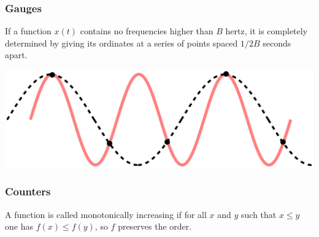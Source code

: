 \begin{frame}
    \frametitle{Gauges}

    \begin{theorem}
        If a function $x(t)$ contains no frequencies higher than $B$ hertz, it
        is completely determined by giving its ordinates at a series of points
        spaced $1 / 2B$ seconds apart.
    \end{theorem}

    \begin{center}
        \includegraphics[width=0.8\linewidth]{CPT-sound-nyquist-thereom-1.5percycle.png}
    \end{center}
\end{frame}

\begin{frame}
    \frametitle{Counters}

    \begin{definition}
        A function is called monotonically increasing if for all $x$ and
        $y$ such that $x \leq y$ one has
        $f(x) \leq f(y)$, so $f$
        preserves the order.
    \end{definition}

    \begin{center}
    \end{center}
\end{frame}

